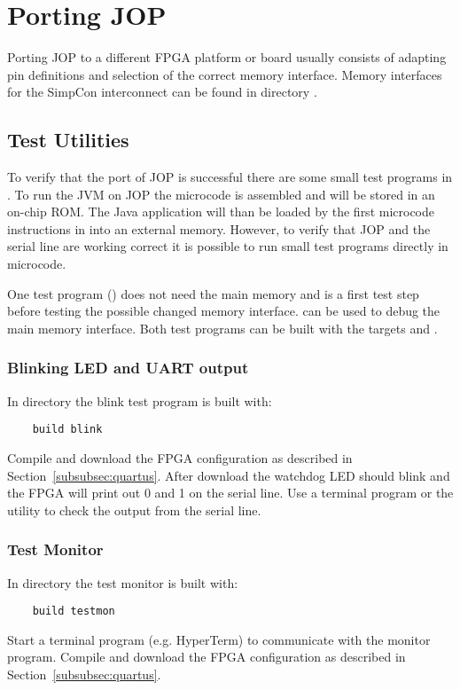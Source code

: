 \section{Porting JOP}

Porting JOP to a different FPGA platform or board usually consists
of adapting pin definitions and selection of the correct memory
interface. Memory interfaces for the SimpCon interconnect can be
found in directory .

\subsection{Test Utilities}

To verify that the port of JOP is successful there are some small
test programs in . To run the JVM on JOP the
microcode  is assembled and will be stored in an
on-chip ROM. The Java application will than be loaded by the first
microcode instructions in  into an external memory.
However, to verify that JOP and the serial line are working correct
it is possible to run small test programs directly in microcode.

One test program () does not need the main memory
and is a first test step before testing the possible changed memory
interface.  can be used to debug the main memory
interface. Both test programs can be built with the 
targets  and .

\subsubsection{Blinking LED and UART output}

In directory  the blink test program is built with:
%
\begin{verbatim}
    build blink
\end{verbatim}
%
Compile and download the FPGA configuration as described in
Section~\ref{subsubsec:quartus}. After download the watchdog LED
should blink and the FPGA will print out 0 and 1 on the serial line.
Use a terminal program or the utility  to check the
output from the serial line.

\subsubsection{Test Monitor}

In directory  the test monitor is built with:
%
\begin{verbatim}
    build testmon
\end{verbatim}
%
Start a terminal program (e.g. HyperTerm) to communicate with the
monitor program. Compile and download the FPGA configuration as
described in Section~\ref{subsubsec:quartus}.

